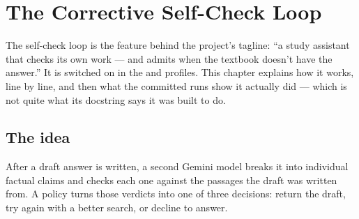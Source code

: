 \chapter{The Corrective Self-Check Loop}
\label{ch:corrective}

The self-check loop is the feature behind the project's tagline: \enquote{a study assistant that checks its own work --- and admits when the textbook doesn't have the answer.} It is switched on in the  and  profiles. This chapter explains how it works, line by line, and then what the committed runs show it actually did --- which is not quite what its docstring says it was built to do.

\section{The idea}

After a draft answer is written, a second Gemini model breaks it into individual factual claims and checks each one against the passages the draft was written from. A policy turns those verdicts into one of three decisions: return the draft, try again with a better search, or decline to answer.

